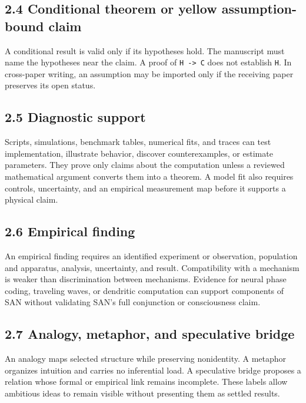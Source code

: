 \documentclass[
  american,
  11pt,
  letterpaper,
]{article}
\begin{document}
\subsection{2.4 Conditional theorem or yellow assumption-bound claim}\label{conditional-theorem-or-yellow-assumption-bound-claim}

A conditional result is valid only if its hypotheses hold. The manuscript must name the hypotheses near the claim. A proof of \texttt{H\ -\textgreater{}\ C} does not establish \texttt{H}. In cross-paper writing, an assumption may be imported only if the receiving paper preserves its open status.

\subsection{2.5 Diagnostic support}\label{diagnostic-support}

Scripts, simulations, benchmark tables, numerical fits, and traces can test implementation, illustrate behavior, discover counterexamples, or estimate parameters. They prove only claims about the computation unless a reviewed mathematical argument converts them into a theorem. A model fit also requires controls, uncertainty, and an empirical measurement map before it supports a physical claim.

\subsection{2.6 Empirical finding}\label{empirical-finding}

An empirical finding requires an identified experiment or observation, population and apparatus, analysis, uncertainty, and result. Compatibility with a mechanism is weaker than discrimination between mechanisms. Evidence for neural phase coding, traveling waves, or dendritic computation can support components of SAN without validating SAN's full conjunction or consciousness claim.

\subsection{2.7 Analogy, metaphor, and speculative bridge}\label{analogy-metaphor-and-speculative-bridge}

An analogy maps selected structure while preserving nonidentity. A metaphor organizes intuition and carries no inferential load. A speculative bridge proposes a relation whose formal or empirical link remains incomplete. These labels allow ambitious ideas to remain visible without presenting them as settled results.
\end{document}
